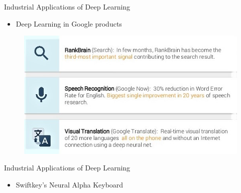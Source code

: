 \documentclass[10pt]{beamer}
\begin{document}
	\begin{frame}[t]{Industrial Applications of Deep Learning}
		\begin{itemize}
			\item \large{Deep Learning in Google products}
		\end{itemize}
		\begin{figure}
			\includegraphics[width=\linewidth]{images/dl_ingoogle}
		\end{figure}
	\end{frame}
	\begin{frame}[t]{Industrial Applications of Deep Learning}
		\begin{itemize}
			\item \large{Swiftkey's Neural Alpha Keyboard}
		\end{itemize}
	\end{frame}	
\end{document}
